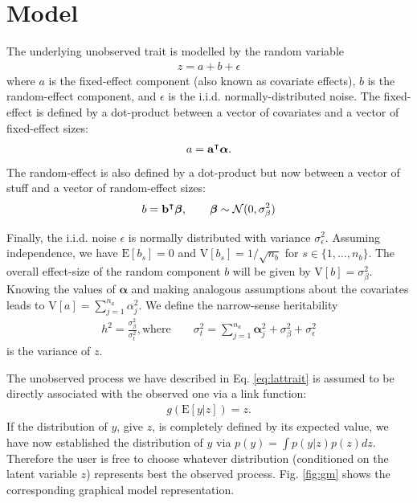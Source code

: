 \section{Model}

The underlying unobserved trait is modelled by the random variable
\begin{align}\label{eq:lattrait}
  z = a + b + \epsilon
\end{align} where $a$ is the fixed-effect
component (also known as covariate effects), $b$ is the random-effect component,
and $\epsilon$ is the i.i.d. normally-distributed noise.
The fixed-effect is defined by a dot-product between a vector of covariates and
a vector of fixed-effect sizes:
\begin{align*}
  a = \mathbf a^\intercal \boldsymbol\alpha.
\end{align*}
The random-effect is also defined by a dot-product but now between
a vector of stuff and a vector of random-effect sizes:
\begin{align*}
  b = \mathbf b^\intercal \boldsymbol\beta, \qquad \boldsymbol\beta \sim \mathcal N(0, \sigma^2_{\beta})
\end{align*}

Finally, the i.i.d. noise $\epsilon$ is normally distributed with variance
$\sigma^2_{\epsilon}$.
Assuming independence, we have $\mathrm E[b_s] = 0$ and
$\mathrm V[b_s]=1/\sqrt{n_b}$ for $s \in \{1, \dots, n_b\}$.
The overall effect-size of the random component $b$ will be given by
$\mathrm V[b] = \sigma^2_{\beta}$.
Knowing the values of $\boldsymbol\alpha$ and making analogous
assumptions about the covariates leads to $\mathrm V[a]  =
\sum_{j=1}^{n_a} \alpha_j^2$.
We define the narrow-sense heritability
\begin{align*}
  h^2=\frac{\sigma^2_{\beta}}{\sigma_t^2}, \text{where} \qquad \sigma_t^2 =
  \sum_{j=1}^{n_a} \boldsymbol \alpha_j^2 + \sigma^2_{\beta} +
  \sigma^2_{\epsilon}
\end{align*}
is the variance of $z$.

The unobserved process we have described in Eq. \eqref{eq:lattrait} is assumed
to be directly associated with the observed one via a link function:
\begin{align*}
  g(\mathrm E[y|z]) = z.
\end{align*}
If the distribution of $y$, give $z$, is completely defined by its
expected value, we have now established the distribution of $y$ via
$p(y) = \int p(y|z)p(z)dz$.
Therefore the user is free to choose whatever distribution (conditioned on the
latent variable $z$) represents best the observed process.
Fig. \ref{fig:gm} shows the corresponding graphical model representation.

